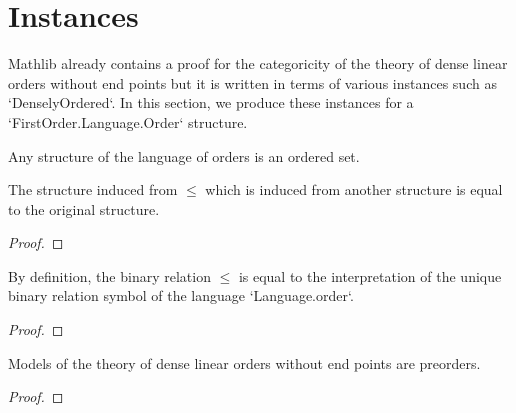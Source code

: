 \section{Instances}

Mathlib already contains a proof for the categoricity of the theory of dense linear orders without end points but it is written in terms of various instances such as `DenselyOrdered`. In this section, we produce these instances for a `FirstOrder.Language.Order` structure.


\begin{definition}
    \label{def:le-instance-language-order}
    \leanok
    Any structure of the language of orders is an ordered set.
\end{definition}

\begin{lemma}
    \label{lem:order-structure-of-le}
    \leanok
    The structure induced from $\le$ which is induced from another structure is equal to the original structure.
\end{lemma}
\begin{proof}
    \leanok
\end{proof}

\begin{lemma}
    \label{lem:instOrderedStructureOrder_formalTextbookModelTheory}
    \leanok
    By definition, the binary relation $\le$ is equal to the interpretation of the unique binary relation symbol of the language `Language.order`.
\end{lemma}
\begin{proof}
    \leanok
\end{proof}

\begin{lemma}
    \label{lem:preorder-dlo}
    \leanok
    Models of the theory of dense linear orders without end points are preorders.
\end{lemma}
\begin{proof}
    \leanok
\end{proof}

